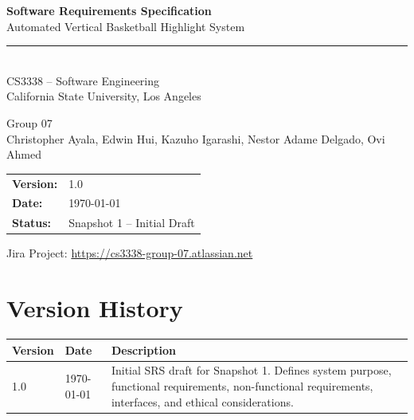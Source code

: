 \documentclass[12pt]{article}
\begin{document}
\begin{titlepage}
    \centering
    \vspace*{2cm}

    {\LARGE\bfseries Software Requirements Specification\\[0.5em]}
    {\Large Automated Vertical Basketball Highlight System\\[2em]}

    \rule{\linewidth}{0.5pt}\\[1em]

    {\large CS3338 -- Software Engineering\\
    California State University, Los Angeles\\[1em]}

    {\large Group 07\\[2em]}
    {\normalsize Christopher Ayala, Edwin Hui, Kazuho Igarashi, Nestor Adame Delgado, Ovi Ahmed\\[2em]}

    \begin{tabular}{ll}
        \textbf{Version:}  & 1.0                   \\
        \textbf{Date:}     & \today                \\
        \textbf{Status:}   & Snapshot 1 -- Initial Draft \\
    \end{tabular}

    \vfill
    {\small Jira Project: \href{https://cs3338-group-07.atlassian.net}{https://cs3338-group-07.atlassian.net}}
\end{titlepage}

\newpage
\tableofcontents
\newpage

\section*{Version History}

\begin{longtable}{|p{1in}|p{1.5in}|p{3.5in}|}
\hline
\textbf{Version} & \textbf{Date} & \textbf{Description} \\
\hline
1.0 & \today & Initial SRS draft for Snapshot 1. Defines system purpose, functional requirements, non-functional requirements, interfaces, and ethical considerations. \\
\hline
\end{longtable}
\end{document}

